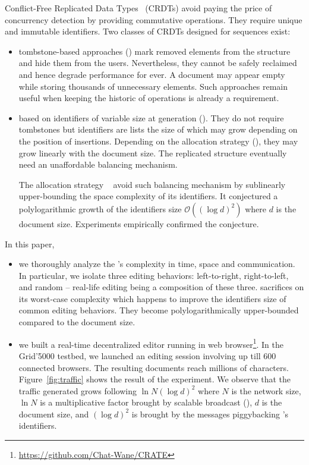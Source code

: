 Conflict-Free Replicated Data Types~\cite{shapiro2011comprehensive} (CRDTs)
avoid paying the price of concurrency detection by providing commutative
operations. They require unique and immutable identifiers. Two classes of CRDTs
designed for sequences exist:
\begin{itemize}
\item tombstone-based approaches (\REF) mark removed elements from the structure
  and hide them from the users. Nevertheless, they cannot be safely reclaimed
  and hence degrade performance for ever. A document may appear empty while
  storing thousands of unnecessary elements. Such approaches remain useful when
  keeping the historic of operations is already a requirement.
\item based on identifiers of variable size at generation (\REF). They do not
  require tombstones but identifiers are lists the size of which may grow
  depending on the position of insertions. Depending on the allocation strategy
  (\REF), they may grow linearly with the document size. The replicated
  structure eventually need an unaffordable balancing mechanism.

  The allocation strategy \LSEQ~\cite{nedelec2013concurrency} avoid such
  balancing mechanism by sublinearly upper-bounding the space complexity of its
  identifiers. It conjectured a polylogarithmic growth of the identifiers size
  $\mathcal{O}((\log d)^2)$ where $d$ is the document size. Experiments
  empirically confirmed the conjecture.
\end{itemize}

In this paper,
\begin{itemize}
\item we thoroughly analyze the \LSEQ's complexity in time, space and
  communication. In particular, we isolate three editing behaviors:
  left-to-right, right-to-left, and random -- real-life editing being a
  composition of these three. \LSEQ sacrifices on its worst-case complexity
  which  happens to improve the identifiers size of common editing
  behaviors. They become polylogarithmically upper-bounded compared to the
  document size.
\item we built a real-time decentralized editor running in web
  browser\footnote{\url{https://github.com/Chat-Wane/CRATE}}. In the Grid'5000
  testbed, we launched an editing session involving up till 600 connected
  browsers. The resulting documents reach millions of
  characters. Figure~\ref{fig:traffic} shows the result of the experiment. We
  observe that the traffic generated grows following $\ln N (\log d)^2$ where
  $N$ is the network size, $\ln N$ is a multiplicative factor brought by
  scalable broadcast (\REF), $d$ is the document size, and $(\log d)^2$ is
  brought by the messages piggybacking \LSEQ's identifiers.
\end{itemize}

